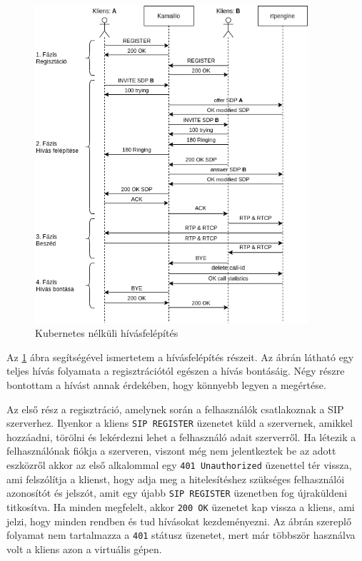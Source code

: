\begin{figure}[!ht]
	\centering
	\includegraphics[width=0.9\textwidth, keepaspectratio]{figures/basic_call_flow.png}
	\caption{Kubernetes nélküli hívásfelépítés}
	\label{fig:callflow}
\end{figure}

Az \ref{fig:callflow} ábra segítségével ismertetem a hívásfelépítés részeit.  Az ábrán 
látható egy teljes hívás folyamata a regisztrációtól egészen a hívás bontásáig. Négy 
részre bontottam a hívást annak érdekében, hogy könnyebb legyen a megértése.

Az első rész a regisztráció, amelynek során a felhasználók csatlakoznak a SIP szerverhez.
Ilyenkor a kliens \texttt{SIP REGISTER} üzenetet küld a szervernek, amikkel hozzáadni, 
törölni és lekérdezni lehet a felhasználó adait szerverről. Ha létezik a felhasználónak 
fiókja a szerveren, viszont még nem jelentkeztek be az adott eszközről akkor az első 
alkalommal egy \texttt{401 Unauthorized} üzenettel tér vissza, ami felszólítja a klienst, 
hogy adja meg a hitelesítéshez szükséges felhasználói azonosítót és jelszót, amit egy 
újabb \texttt{SIP REGISTER} üzenetben fog újraküldeni titkosítva. Ha minden megfelelt, 
akkor \texttt{200 OK} üzenetet kap vissza a kliens, ami jelzi, hogy minden rendben és tud 
hívásokat kezdeményezni. Az ábrán szereplő folyamat nem tartalmazza a \texttt{401} 
státusz üzenetet, mert már többször használva volt a kliens azon a virtuális gépen.


